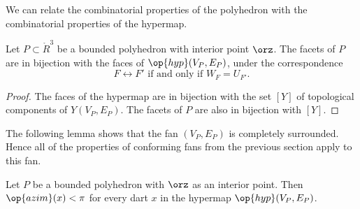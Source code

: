 %

We can relate the combinatorial properties of the polyhedron with the
combinatorial properties of the hypermap.

\begin{lemma}[]\label{lemma:facet-bi}
Let $P\subset\ring{R}^3$ be a bounded polyhedron with interior point
$\orz$.  The facets of $P$ are in bijection with the faces of
$\op{hyp}(V_P,E_P)$, under the correspondence
\begin{displaymath}
F\leftrightarrow F' \text{ if and only if } W_F = U_{F'}.
\end{displaymath}
\end{lemma}

\begin{proof} The faces of the hypermap are in bijection with the set
$[Y]$ of topological components of $Y(V_P,E_P)$.  The facets of $P$
are also in bijection with $[Y]$.
\end{proof}

The following lemma shows that the fan $(V_P,E_P)$ is completely
surrounded.  Hence all of the properties of conforming fans from the previous
section apply to this fan.

\begin{lemma}[] Let $P$ be a bounded polyhedron
with $\orz$ as an interior point.  Then $\op{azim}(x) < \pi$ for
every dart $x$ in the hypermap $\op{hyp}(V_P,E_P)$.
\end{lemma}
%
%
%
%

